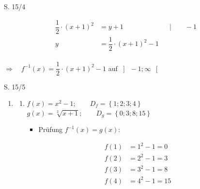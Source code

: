 \begin{Exercise}{S. 15/4}{}
\begin{enumerate}
\begin{enumerate}[label=\alph*)]
{\begin{itemize}[leftmargin=*]
{\begin{align*}
                            \dfrac{1}{2} \cdot (x + 1)^2 & = y +1 &&| \qquad -1\\[1.5ex]
                            y & = \dfrac{1}{2} \cdot (x + 1)^2 - 1 &&
                        \end{align*}\\
                        $\Rightarrow \quad f^{-1}(x) = \dfrac{1}{2} \cdot (x + 1)^2 - 1$ \quad auf \quad $\left] \ -1; \infty \ \right[$\\
                        }                        
                \end{itemize}
            }
        \end{enumerate}
    \end{enumerate}
\end{Exercise}

\begin{Exercise}{S. 15/5}{}
    \begin{enumerate}
        \item [5.]\begin{enumerate}[label=\alph*)]
            \item[c)] {
                $f(x) = x^{2} - 1; \qquad D_{f} = \left\{1; 2; 3; 4 \right\}$\\[1.0ex]
                $g(x) = \sqrt[2]{x+1}; \qquad D_{g} = \left\{0; 3; 8; 15 \right\}$\\[-1.0ex]
                \begin{itemize}[leftmargin=*]
                    \item Prüfung $f^{-1}(x) = g(x)$:\\{
                        \vspace{-3.0ex}
                        \begin{minipage}[t]{0.45\linewidth}
                            \begin{align*}
                                f(1) &= 1^{2} - 1 = 0 &&\\[1.5ex]
                                f(2) &= 2^{2} - 1 = 3 &&\\[1.5ex]
                                f(3) &= 3^{2} - 1 = 8 &&\\[1.5ex]
                                f(4) &= 4^{2} - 1 = 15 &&\\[3.0ex]
                            \end{align*}
                        \end{minipage}
                        \hfill
                        \begin{minipage}[t]{0.45\linewidth}

\end{minipage}}
\end{itemize}}
\end{enumerate}
\end{enumerate}
\end{Exercise}
